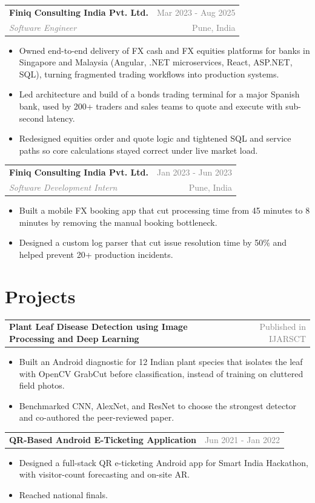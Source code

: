 \documentclass[10pt, letterpaper]{article}
\makeatletter
\newcommand{\resumeEntry}[4]{%
  \vspace{2pt}%
  \noindent
  \begin{tabularx}{\linewidth}{@{}X r@{}}
    \textbf{#1} & \textcolor{gray}{\small #2} \\[-1pt]
    \textit{\textcolor{gray}{\small #3}} & \textcolor{gray}{\small #4}
  \end{tabularx}%
}
\newcommand{\projectEntry}[2]{%
  \vspace{2pt}%
  \noindent
  \begin{tabularx}{\linewidth}{@{}X r@{}}
    \textbf{#1} & \textcolor{gray}{\small #2}
  \end{tabularx}\par
}
\makeatother
\begin{document}
\resumeEntry{Finiq Consulting India Pvt. Ltd.}{Mar 2023 - Aug 2025}
  {Software Engineer}{Pune, India}
\begin{itemize}
  \item Owned end-to-end delivery of FX cash and FX equities platforms for banks in Singapore and Malaysia (Angular, .NET microservices, React, ASP.NET, SQL), turning fragmented trading workflows into production systems.
  \item Led architecture and build of a bonds trading terminal for a major Spanish bank, used by 200+ traders and sales teams to quote and execute with sub-second latency.
  \item Redesigned equities order and quote logic and tightened SQL and service paths so core calculations stayed correct under live market load.
\end{itemize}

\resumeEntry{Finiq Consulting India Pvt. Ltd.}{Jan 2023 - Jun 2023}
  {Software Development Intern}{Pune, India}
\begin{itemize}
  \item Built a mobile FX booking app that cut processing time from 45 minutes to 8 minutes by removing the manual booking bottleneck.
  \item Designed a custom log parser that cut issue resolution time by 50\% and helped prevent 20+ production incidents.
\end{itemize}

\section{Projects}

\projectEntry{Plant Leaf Disease Detection using Image Processing and Deep Learning}{Published in IJARSCT}
\begin{itemize}
  \item Built an Android diagnostic for 12 Indian plant species that isolates the leaf with OpenCV GrabCut before classification, instead of training on cluttered field photos.
  \item Benchmarked CNN, AlexNet, and ResNet to choose the strongest detector and co-authored the peer-reviewed paper.
\end{itemize}

\projectEntry{QR-Based Android E-Ticketing Application}{Jun 2021 - Jan 2022}
\begin{itemize}
  \item Designed a full-stack QR e-ticketing Android app for Smart India Hackathon, with visitor-count forecasting and on-site AR.
  \item Reached national finals.
\end{itemize}
\end{document}
